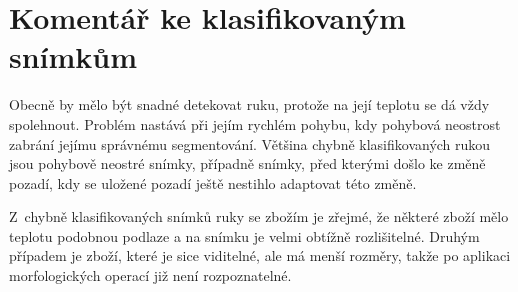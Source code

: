 	\section{Komentář ke klasifikovaným snímkům}
    Obecně by mělo být snadné detekovat ruku, protože na její teplotu se dá vždy spolehnout. Problém nastává při jejím rychlém pohybu, kdy pohybová neostrost zabrání jejímu správnému segmentování. Většina chybně klasifikovaných rukou jsou pohybově neostré snímky, případně snímky, před kterými došlo ke změně pozadí, kdy se uložené pozadí ještě nestihlo adaptovat této změně.
    
    Z~chybně klasifikovaných snímků ruky se zbožím je zřejmé, že některé zboží mělo teplotu podobnou podlaze a na snímku je velmi obtížně rozlišitelné. Druhým případem je zboží, které je sice viditelné, ale má menší rozměry, takže po aplikaci morfologických operací již není rozpoznatelné.

